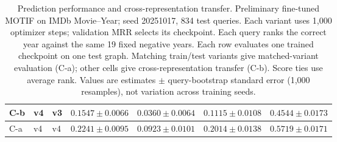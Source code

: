 \begin{table}[htbp]
\begin{adjustbox}{max width=\linewidth}
\begin{tabular}{|l|l|l|l|l|l|l|}
\hline
C-b & v4 & v3 & $0.1547 \pm 0.0066$ & $0.0360 \pm 0.0064$ & $0.1115 \pm 0.0108$ & $0.4544 \pm 0.0173$ \\
\hline
C-a & v4 & v4 & $0.2241 \pm 0.0095$ & $0.0923 \pm 0.0101$ & $0.2014 \pm 0.0138$ & $0.5719 \pm 0.0171$ \\
\hline
\end{tabular}
\end{adjustbox}
\caption{Prediction performance and cross-representation transfer. Preliminary fine-tuned MOTIF on IMDb Movie--Year; seed 20251017, 834 test queries. Each variant uses 1,000 optimizer steps; validation MRR selects its checkpoint. Each query ranks the correct year against the same 19 fixed negative years. Each row evaluates one trained checkpoint on one test graph. Matching train/test variants give matched-variant evaluation (C-a); other cells give cross-representation transfer (C-b). Score ties use average rank. Values are estimates $\pm$ query-bootstrap standard error (1,000 resamples), not variation across training seeds.}
\label{tab:motif-imdb-movie-year-matrix-transfer-performance}
\end{table}

